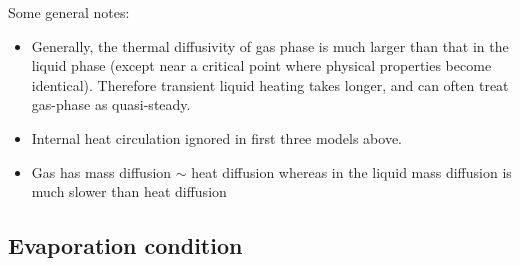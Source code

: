\documentclass[12pt]{report}
\begin{document}
Some general notes:
\begin{itemize}
\item Generally, the thermal diffusivity of gas phase is much larger than that in the liquid phase (except near a critical point where physical properties become identical).
  Therefore transient liquid heating takes longer, and can often treat gas-phase as quasi-steady.
\item Internal heat circulation ignored in first three models above.
\item Gas has mass diffusion $\sim$ heat diffusion whereas in the liquid mass diffusion is much slower than heat diffusion
\end{itemize}

\subsection{Evaporation condition}
\end{document}
